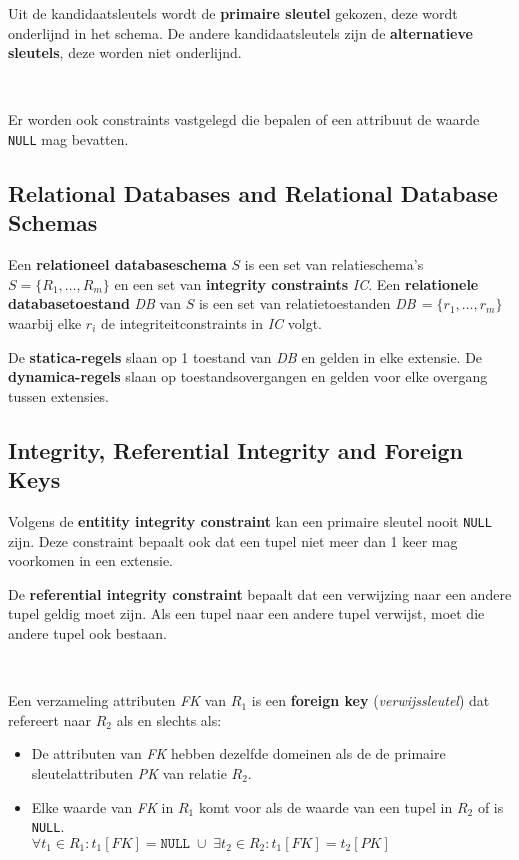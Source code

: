 Uit de kandidaatsleutels wordt de \textbf{primaire sleutel} gekozen, deze wordt onderlijnd in het schema. De andere kandidaatsleutels zijn de \textbf{alternatieve sleutels}, deze worden niet onderlijnd.

~

\noindent Er worden ook constraints vastgelegd die bepalen of een attribuut de waarde \texttt{NULL} mag bevatten.

\subsection{Relational Databases and Relational Database Schemas}
Een \textbf{relationeel databaseschema} $S$ is een set van relatieschema's $S = \{R_1, \dots, R_m\}$ en een set van \textbf{integrity constraints} \textit{IC}. Een \textbf{relationele databasetoestand} \textit{DB} van $S$ is een set van relatietoestanden \textit{DB}$\,= \{r_1, \dots, r_m\}$ waarbij elke $r_i$ de integriteitconstraints in \textit{IC} volgt.

De \textbf{statica-regels} slaan op 1 toestand van \textit{DB} en gelden in elke extensie. De \textbf{dynamica-regels} slaan op toestandsovergangen en gelden voor elke overgang tussen extensies.

\subsection{Integrity, Referential Integrity and Foreign Keys}
Volgens de \textbf{entitity integrity constraint} kan een primaire sleutel nooit \texttt{NULL} zijn. Deze constraint bepaalt ook dat een tupel niet meer dan 1 keer mag voorkomen in een extensie.

De \textbf{referential integrity constraint} bepaalt dat een verwijzing naar een andere tupel geldig moet zijn. Als een tupel naar een andere tupel verwijst, moet die andere tupel ook bestaan.

~

\noindent Een verzameling attributen \textit{FK} van $R_1$ is een \textbf{foreign key} (\textit{verwijssleutel}) dat refereert naar $R_2$ als en slechts als:
\begin{itemize}
	\item De attributen van \textit{FK} hebben dezelfde domeinen als de de primaire sleutelattributen \textit{PK} van relatie $R_2$.
	\item Elke waarde van \textit{FK} in $R_1$ komt voor als de waarde van een tupel in $R_2$ of is \texttt{NULL}.\\
	$\forall t_1 \in R_1 : t_1[\mathit{FK}] = \mathtt{NULL} \; \cup \; \exists t_2 \in R_2 :  t_1[\mathit{FK}] = t_2[\mathit{PK}]$
\end{itemize}

